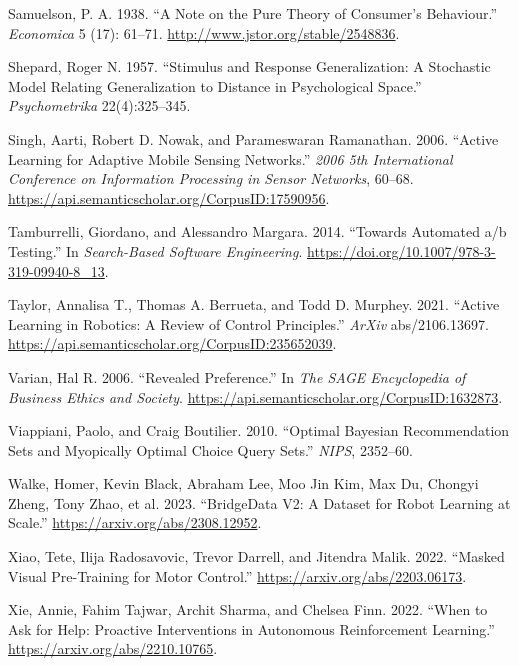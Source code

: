 \documentclass[
  letterpaper,
  DIV=11,
  numbers=noendperiod,
  oneside]{scrreprt}
\newlength{\cslhangindent}
\newenvironment{CSLReferences}[2] %
 {\begin{list}{}{%
  \setlength{\itemindent}{0pt}
  \setlength{\leftmargin}{0pt}
  \setlength{\parsep}{0pt}
  \ifodd #1
   \setlength{\leftmargin}{\cslhangindent}
   \setlength{\itemindent}{-1\cslhangindent}
  \fi
  \setlength{\itemsep}{#2\baselineskip}}}
 {\end{list}}
\theoremstyle{remark}
\begin{document}
\begin{CSLReferences}{1}{0}
Samuelson, P. A. 1938. {``A Note on the Pure Theory of Consumer's
Behaviour.''} \emph{Economica} 5 (17): 61--71.
\url{http://www.jstor.org/stable/2548836}.

Shepard, Roger N. 1957. {``Stimulus and Response Generalization: A
Stochastic Model Relating Generalization to Distance in Psychological
Space.''} \emph{Psychometrika} 22(4):325--345.

Singh, Aarti, Robert D. Nowak, and Parameswaran Ramanathan. 2006.
{``Active Learning for Adaptive Mobile Sensing Networks.''} \emph{2006
5th International Conference on Information Processing in Sensor
Networks}, 60--68.
\url{https://api.semanticscholar.org/CorpusID:17590956}.

Tamburrelli, Giordano, and Alessandro Margara. 2014. {``Towards
Automated a/b Testing.''} In \emph{Search-Based Software Engineering}.
\url{https://doi.org/10.1007/978-3-319-09940-8_13}.

Taylor, Annalisa T., Thomas A. Berrueta, and Todd D. Murphey. 2021.
{``Active Learning in Robotics: A Review of Control Principles.''}
\emph{ArXiv} abs/2106.13697.
\url{https://api.semanticscholar.org/CorpusID:235652039}.

Varian, Hal R. 2006. {``Revealed Preference.''} In \emph{The SAGE
Encyclopedia of Business Ethics and Society}.
\url{https://api.semanticscholar.org/CorpusID:1632873}.

Viappiani, Paolo, and Craig Boutilier. 2010. {``Optimal Bayesian
Recommendation Sets and Myopically Optimal Choice Query Sets.''}
\emph{NIPS}, 2352--60.

Walke, Homer, Kevin Black, Abraham Lee, Moo Jin Kim, Max Du, Chongyi
Zheng, Tony Zhao, et al. 2023. {``BridgeData V2: A Dataset for Robot
Learning at Scale.''} \url{https://arxiv.org/abs/2308.12952}.

Xiao, Tete, Ilija Radosavovic, Trevor Darrell, and Jitendra Malik. 2022.
{``Masked Visual Pre-Training for Motor Control.''}
\url{https://arxiv.org/abs/2203.06173}.

Xie, Annie, Fahim Tajwar, Archit Sharma, and Chelsea Finn. 2022. {``When
to Ask for Help: Proactive Interventions in Autonomous Reinforcement
Learning.''} \url{https://arxiv.org/abs/2210.10765}.


\end{CSLReferences}
\end{document}
